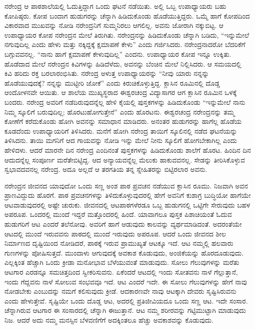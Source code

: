 ನರೇಂದ್ರ ಆ ಪಾಠಶಾಲೆಯಲ್ಲಿ ಓದುತ್ತಿದ್ದಾಗ ಒಂದು ಘಟನೆ ನಡೆಯಿತು. ಅಲ್ಲಿ ಒಬ್ಬ ಉಪಾಧ್ಯಾಯರು ಬಹು ಕೋಪಿಷ್ಠರು. ಕೋಪ ಬಂದಾಗ ಹುಡುಗರನ್ನು ಚೆನ್ನಾಗಿ ಹಿಡಿದುಕೊಂಡು ಹೊಡೆಯುತ್ತಿದ್ದರು. ಒಮ್ಮೆ ಹಾಗೆ ಕೋಪದಿಂದ ವಿಕಾರವಾದ ಮುಖವನ್ನು ನೋಡಿ ನರೇಂದ್ರನಿಗೆ ಸುಮ್ಮನಿರಲು ಆಗಲಿಲ್ಲ. ಅವನು ಜೋರಾಗಿ ನಕ್ಕುಬಿಟ್ಟ. ಆ ಉಪಾಧ್ಯಾಯರ ಕೋಪ ನರೇಂದ್ರನ ಮೇಲೆ ತಿರುಗಿತು. ನರೇಂದ್ರನನ್ನು ಹಿಡಿದುಕೊಂಡು ಚೆನ್ನಾಗಿ ಬಡಿದು, “ಇನ್ನುಮೇಲೆ ನಗುವುದಿಲ್ಲ ಎಂದು ಹೇಳು ಮತ್ತು ನಕ್ಕಿದ್ದಕ್ಕೆ ಕ್ಷಮಾಪಣೆ ಕೇಳು” ಎಂದು ಗರ್ಜಿಸಿದರು. ನರೇಂದ್ರನಾದರೋ ಬೆದರಿಕೆಗೆ ಬಗ್ಗುವವನಲ್ಲ. “ನಾನು ಹಾಗೆ ಕ್ಷಮಾಪಣೆ ಕೇಳುವುದಿಲ್ಲ” ಎಂದನು. ಉಪಾಧ್ಯಾಯರ ಕೋಪ ಇನ್ನೂ ಉಕ್ಕಿತು. ಹೊಡೆದಾದ ಮೇಲೆ ನರೇಂದ್ರನ ಕಿವಿಗಳನ್ನು ಹಿಡಿದೆಳೆದು, ಅವನನ್ನು ಬೆಂಚಿನ ಮೇಲೆ ನಿಲ್ಲಿಸಿದರು. ಆ ಸಮಯದಲ್ಲಿ ಕಿವಿ ಹರಿದು ರಕ್ತ ಬರಲಾರಂಭಿಸಿತು. ನರೇಂದ್ರ ಅಳುತ್ತ ಉಪಾಧ್ಯಾಯರನ್ನು “ನೀವು ಯಾರು ನನ್ನನ್ನು ಹೊಡೆಯುವುದಕ್ಕೆ? ನನ್ನನ್ನು ಮುಟ್ಟೀರಿ ಜೋಕೆ” ಎಂದು ಕಿರುಚಿಕೊಳ್ಳುತ್ತಿದ್ದ. ಕ್ಲಾಸಿನ ರೂಮಿನಲ್ಲಿ ದೊಡ್ಡ ಆಂದೋಳನವೇ ಆಯಿತು. ಆ ಶಾಲೆಯ ಮುಖ್ಯಸ್ಥರಾದ ಈಶ್ವರಚಂದ್ರ ವಿದ್ಯಾಸಾಗರ ಆಗ ಕ್ಲಾಸಿನ ರೂಮಿನ ಒಳಕ್ಕೆ ಬಂದರು. ನರೇಂದ್ರ ಅವರಿಗೆ ನಡೆದಿರುವುದನ್ನೆಲ್ಲ ಹೇಳಿ ಕೈಯಲ್ಲಿ ಪುಸ್ತಕಗಳನ್ನು ಹಿಡಿದುಕೊಂಡು “ಇನ್ನುಮೇಲೆ ನಾನು ನಿಮ್ಮ ಸ್ಕೂಲಿಗೆ ಬರುವುದಿಲ್ಲ; ಹೊರಟುಹೋಗುತ್ತೇನೆ” ಎಂದು ಹೊರಟನು. ಈಶ್ವರಚಂದ್ರ ನರೇಂದ್ರನನ್ನು ತಮ್ಮ ಕೋಣೆಗೆ ಕರೆದುಕೊಂಡು ಹೋಗಿ ಅವನನ್ನು ಸಮಾಧಾನ ಮಾಡಿದರು. ಅನಂತರ ಹುಡುಗರನ್ನು ಹಾಗೆಲ್ಲ ಹೊಡೆಯ ಕೂಡದೆಂದು ಉಪಾಧ್ಯಾಯರಿಗೆ ತಿಳಿಸಿದರು. ಮನೆಗೆ ಹೋಗಿ ನರೇಂದ್ರ ತಾಯಿಗೆ ಸ್ಕೂಲಿನಲ್ಲಿ ನಡೆದ ಘಟನೆಯನ್ನು ತಿಳಿಸಿದನು. ತಾಯಿ ಮಗನಿಗೆ ಆದ ಗಾಯವನ್ನು ನೋಡಿ ಇನ್ನು ಮೇಲೆ ನೀನು ಸ್ಕೂಲಿಗೆ ಹೋಗಬೇಕಾಗಿಲ್ಲ ಎಂದು ಹೇಳಿದಳು. ಆದರೆ ಮಾರನೇ ದಿನ ನರೇಂದ್ರ ಎಂದಿನಂತೆ ಪುಸ್ತಕಗಳನ್ನು ಹಿಡಿದುಕೊಂಡು ಶಾಲೆಗೆ ಹೊರಟ. ಹಿಂದಿನ ದಿನ ಆದುದನ್ನೆಲ್ಲ ಸಂಪೂರ್ಣ ಮರೆತೇಬಿಟ್ಟಿದ್ದ. ಆದ ಅನ್ಯಾಯವನ್ನೆಲ್ಲ ಮೆಲುಕು ಹಾಕುವವನಲ್ಲ. ಸೇಡನ್ನು ತೀರಿಸಿಕೊಳ್ಳುವ ಸ್ವಭಾವದವನಲ್ಲ ನರೇಂದ್ರ. ಅದೂ ಅಲ್ಲದೆ ಆ ತರಗತಿಯ ತನ್ನ ಸ್ನೇಹಿತರನ್ನು ಬಿಟ್ಟಿರಲಾರ ಅವನು.

ನರೇಂದ್ರನ ಜೀವನದ ಯಾವುದೋ ಒಂದು ಸಣ್ಣ ಅಂಶ ಪಾಠ ಪ್ರವಚನ ನಡೆಯುವ ಕ್ಲಾಸಿನ ರೂಮು. ನಿಜವಾಗಿ ಅವನ ಪ್ರಾಣವಿದ್ದುದು ಹೊರಗೆ. ಪಾಠ ಪ್ರವಚನಗಳನ್ನು ತಿಳಿದುಕೊಳ್ಳುವುದರಲ್ಲಿ ಹೇಗೆ ಅವನಿಗೆ ಕುಶಾಗ್ರ ಬುದ್ಧಿಯೋ ಹಾಗೆಯೇ ಆಟವಾಡುವುದರಲ್ಲಿ ಅಷ್ಟೇ ಚುರುಕು. ಜೀವನದಲ್ಲಿ ಆಟಪಾಠಗಳೆರಡೂ ಒಬ್ಬ ಹುಡುಗನಲ್ಲಿ ಒಟ್ಟಿಗೇ ಸೇರುವುದು ಬಹಳ ಅಪರೂಪ. ಒಂದರಲ್ಲಿ ಮುಂದೆ ಇದ್ದರೆ ಮತ್ತೊಂದರಲ್ಲಿ ಹಿಂದೆ. ಯಾವಾಗಲೂ ಪುಸ್ತಕ ಪಿಶಾಚಿಯಂತೆ ಓದುವ ಹುಡುಗರಿಗೆ ಆಟ ಎಂದರೆ ತಲೆನೋವು. ಅವರಿಗೆ ಹಾಗೆ ಆಡುವುದು ಕಾಲವನ್ನು ವ್ಯರ್ಥಮಾಡಿದಂತೆ. ಅದರಂತೆಯೇ ಆಟದಲ್ಲಿ ಮುಂದೆ ಇರುವವನು ಪಾಠದಲ್ಲಿ ಮುಂದೆ ಇರುವುದು ಅಪರೂಪ. ಆದರೆ ಒಂದು ಜೀವನದ ಶೀಲ ನಿರ್ಮಾಣದ ದೃಷ್ಟಿಯಿಂದ ನೋಡಿದರೆ, ಪಾಠಕ್ಕೆ ಇರುವ ಪ್ರಾಮುಖ್ಯತೆ ಆಟಕ್ಕೂ ಇದೆ. ಆಟ ನಮ್ಮಲ್ಲಿ ಹಲವಾರು ಗುಣಗಳನ್ನು ಪೋಷಿಸುತ್ತದೆ. ಮುಂದಾಳು ಆಗುವುದಕ್ಕೆ ಅವಕಾಶ ಕೊಡುವುದು, ಅಂಜಿಕೆಯನ್ನು ಹೊರದೂಡುವುದು. ಎಲ್ಲಕ್ಕಿಂತ ಹೆಚ್ಚಾಗಿ ಒಂದು ಕ್ರೀಡಾ ಮನೋಭಾವ ಬೆಳೆಯುವಂತೆ ಮಾಡುವುದು. ಸೋಲು ಗೆಲುವುಗಳನ್ನು ಮರೆತು ಆಟಗಾರ ಎರಡನ್ನೂ ಸಮಚಿತ್ತದಿಂದ ಸ್ವೀಕರಿಸುವನು. ಏಕೆಂದರೆ ಆಟದಲ್ಲಿ ಇಂದು ಸೋತವನು ನಾಳೆ ಗೆಲ್ಲುತ್ತಾನೆ, ಇಂದು ಗೆದ್ದವನು ನಾಳೆ ಸೋಲುವ ಸಂಭವವೂ ಇದೆ. ಆಟ ಎಂದರೆ ಇದೇ. ಈ ಸೋಲು ಗೆಲುವುಗಳನ್ನು ಹೇಗೆ ನಾವು ನೋಡಬೇಕು ಎಂಬುದನ್ನು ನಮಗೆ ಕಲಿಸುವುದು ಕ್ರೀಡೆ. ಆದಕಾರಣವೇ ನಾವು ಆಟಕ್ಕಾಗಿ ದೇವರು ಸೃಷ್ಟಿಸಿರುವನು ಎಂದು ಹೇಳುತ್ತೇವೆ. ಸೃಷ್ಟಿಯೇ ಒಂದು ದೊಡ್ಡ ಆಟ, ಅದರಲ್ಲಿ ಪ್ರತಿಜೀವಿಯದೂ ಒಂದು ಸಣ್ಣ ಆಟ. ಇದೇ ಸಂಸಾರ. ಚೆನ್ನಾಗಿರುವ ಆಟಗಾರ ಈ ಸಂಸಾರದಲ್ಲಿ ಚೆನ್ನಾಗಿ ಈಜುತ್ತಾನೆ. ಆಟ ನಮ್ಮ ಶರೀರವನ್ನು ಗಟ್ಟಿಮುಟ್ಟಾಗಿ ಮಾಡುವುದು ನಿಜ. ಆದರೆ ಅದು ನಮ್ಮ ಮನಸ್ಸಿನ ಬೆಳವಣಿಗೆಗೆ ಅದಕ್ಕಿಂತಲೂ ಹೆಚ್ಚು ಅವಕಾಶವನ್ನು ಕೊಡುವುದು.

